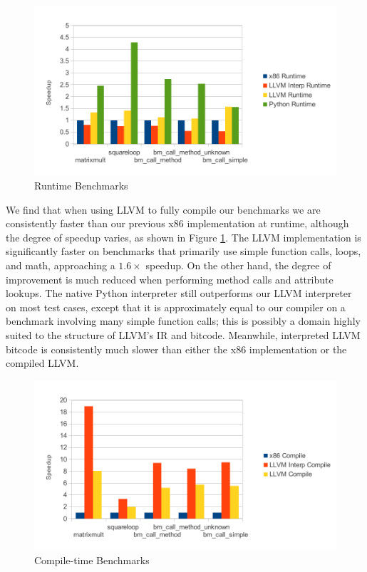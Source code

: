 \documentclass[11pt,twocolumn]{article}
\begin{document}
\begin{figure}[htb]
  \centering
  \includegraphics[scale=.9]{include/pdf/runtime.pdf}
  \caption{Runtime Benchmarks}
  \label{fig:rt}
\end{figure}

We find that when using LLVM to fully compile our benchmarks we are
consistently faster than our previous x86 implementation at runtime,
although the degree of speedup varies, as shown in Figure
\ref{fig:rt}. The LLVM implementation is significantly faster on
benchmarks that primarily use simple function calls, loops, and math,
approaching a $1.6\times$ speedup. On the other hand, the degree of
improvement is much reduced when performing method calls and attribute
lookups. The native Python interpreter still outperforms our LLVM
interpreter on most test cases, except that it is approximately equal
to our compiler on a benchmark involving many simple function calls; 
this is possibly a domain highly suited to the structure of LLVM's IR
and bitcode. Meanwhile, interpreted LLVM bitcode is consistently much
slower than either the x86 implementation or the compiled LLVM.

\begin{figure}[htb]
  \centering
  \includegraphics[scale=.9]{include/pdf/compiletime.pdf}
  \caption{Compile-time Benchmarks}
  \label{fig:ct}
\end{figure}
\end{document}
